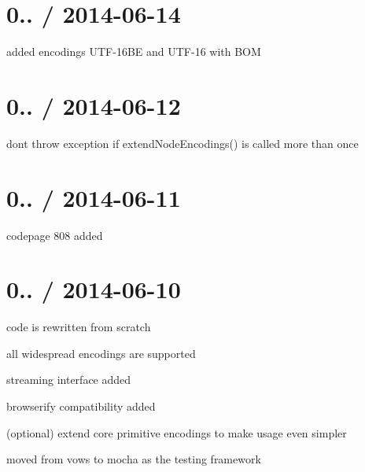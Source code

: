 \section*{0.. / 2014-\/06-\/14}


\begin{DoxyItemize}
\item added encodings U\+T\+F-\/16\+B\+E and U\+T\+F-\/16 with B\+O\+M
\end{DoxyItemize}

\section*{0.. / 2014-\/06-\/12}


\begin{DoxyItemize}
\item don\textquotesingle{}t throw exception if {\ttfamily extend\+Node\+Encodings()} is called more than once
\end{DoxyItemize}

\section*{0.. / 2014-\/06-\/11}


\begin{DoxyItemize}
\item codepage 808 added
\end{DoxyItemize}

\section*{0.. / 2014-\/06-\/10}


\begin{DoxyItemize}
\item code is rewritten from scratch
\item all widespread encodings are supported
\item streaming interface added
\item browserify compatibility added
\item (optional) extend core primitive encodings to make usage even simpler
\item moved from vows to mocha as the testing framework 
\end{DoxyItemize}